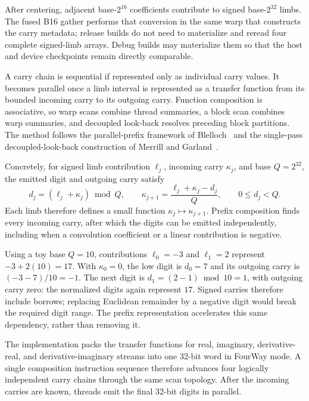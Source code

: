 After centering, adjacent base-$2^{16}$ coefficients contribute to signed
base-$2^{32}$ limbs.  The fused B16 gather performs that conversion in the same
warp that constructs the carry metadata; release builds do not need to
materialize and reread four complete signed-limb arrays.  Debug builds may
materialize them so that the host and device checkpoints remain directly
comparable.

A carry chain is sequential if represented only as individual carry values.
It becomes parallel once a limb interval is represented as a transfer function
from its bounded incoming carry to its outgoing carry.  Function composition is
associative, so warp scans combine thread summaries, a block scan combines warp
summaries, and decoupled look-back resolves preceding block partitions.  The
method follows the parallel-prefix framework of Blelloch~\cite{Blelloch1990PrefixSums}
and the single-pass decoupled-look-back construction of Merrill and
Garland~\cite{merrill2016single}.

Concretely, for signed limb contribution $\ell_j$, incoming carry $\kappa_j$,
and base $Q=2^{32}$, the emitted digit and outgoing carry satisfy
\begin{equation}
  d_j=(\ell_j+\kappa_j)\bmod Q,
  \qquad
  \kappa_{j+1}=\frac{\ell_j+\kappa_j-d_j}{Q},
  \qquad 0\le d_j<Q.
  \label{eq:reference-signed-carry}
\end{equation}
Each limb therefore defines a small function
$\kappa_j\mapsto\kappa_{j+1}$.  Prefix composition finds every incoming
carry, after which the digits can be emitted independently, including when a
convolution coefficient or a linear contribution is negative.

Using a toy base $Q=10$, contributions $\ell_0=-3$ and $\ell_1=2$
represent $-3+2(10)=17$.  With $\kappa_0=0$, the low digit is
$d_0=7$ and its outgoing carry is $(-3-7)/10=-1$.  The next digit is
$d_1=(2-1)\bmod10=1$, with outgoing carry zero: the normalized digits
again represent $17$.  Signed carries therefore include borrows; replacing
Euclidean remainder by a negative digit would break the required digit range.
The prefix representation accelerates this same dependency, rather than
removing it.

The implementation packs the transfer functions for real, imaginary,
derivative-real, and derivative-imaginary streams into one 32-bit word in
FourWay mode.  A single composition instruction sequence therefore advances
four logically independent carry chains through the same scan topology.  After
the incoming carries are known, threads emit the final 32-bit digits in
parallel.

